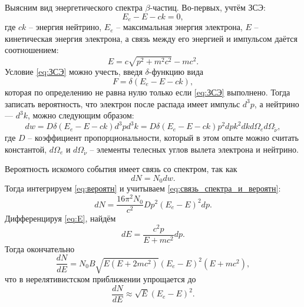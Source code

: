 \documentclass[a4paper,12pt]{article}
\theoremstyle{definition}
\newcommand{\btt}{$\beta $}
\newcommand{\dlt}{$\delta $}
\begin{document}
	Выясним вид энергетического спектра \btt-частиц.
	Во-первых, учтём ЗСЭ:
	\begin{equation}\label{eq:ЗСЭ}
		E_e - E - c k = 0,
	\end{equation}
	где $ c k $ -- энергия нейтрино, $ E_e $ -- максимальная энергия электрона, $ E $ -- кинетическая энергия электрона, а связь между его энергией и импульсом даётся соотношением:
	\begin{equation}\label{eq:E}
		E = c \sqrt{p^2+m^2 c^2} - m c^2.
	\end{equation}
	Условие \eqref{eq:ЗСЭ} можно учесть, введя \dlt-функцию вида
	\begin{equation*}\label{key}
		F = \delta(E_e - E - c k),
	\end{equation*}
	которая по определению не равна нулю только если \eqref{eq:ЗСЭ} выполнено.
	Тогда записать вероятность, что электрон после распада имеет импульс $ d^3 p $, а нейтрино --- $ d^3 k $, можно следующим образом:
	\begin{equation}\label{eq:вероятн}
		d w = D \delta(E_e - E - c k) d^3 p d^3 k = D \delta(E_e - E - c k) p^2 d p k^2 d k d \Omega_e d \Omega_{\widetilde{\nu}},
	\end{equation}
	где $ D $ -- коэффициент пропорциональности, который в этом опыте можно считать константой, $ d \Omega_e $ и $ d \Omega_{\widetilde{\nu}} $ -- элементы телесных углов вылета электрона и нейтрино.
	
	Вероятность искомого события имеет связь со спектром, так как
	\begin{equation}\label{eq:связь_спектра_и_вероятн}
		d N = N_0 d w.
	\end{equation}
	Тогда интегрируем \eqref{eq:вероятн} и учитываем \eqref{eq:связь_спектра_и_вероятн}:
	\begin{equation*}\label{eq:dN}
		d N = \dfrac{16 \pi^2 N_0}{c^2} D p^2 \left(E_e - E\right)^2 d p.
	\end{equation*}
	Дифференцируя \eqref{eq:E}, найдём
	\begin{equation*}\label{key}
		d E = \dfrac{c^2 p}{E+m c^2}d p.
	\end{equation*}
	Тогда окончательно
	\begin{equation}\label{eq:spectre}
		\dfrac{d N}{d E} = N_0 B \sqrt{E\left(E+2 m c^2\right)}\left(E_e-E\right)^2\left(E+m c^2\right), 
	\end{equation}
	что в нерелятивистском приближении упрощается до 
	\begin{equation}\label{eq:simpleSpectre}
		\dfrac{d N}{d E} \approx \sqrt{E} \left(E_e - E\right)^2.
	\end{equation}
	
\end{document}

